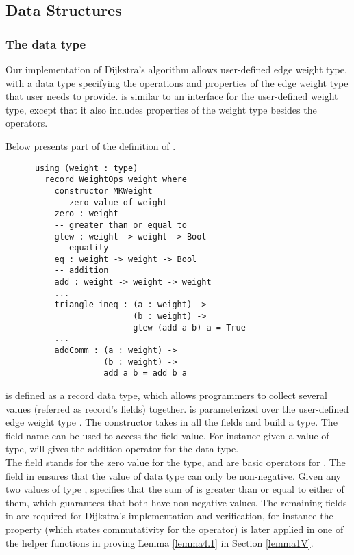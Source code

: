 \subsection{Data Structures} \label{code_structs}
\subsubsection{The  data type}
Our implementation of Dijkstra's algorithm allows user-defined edge weight type, with a  data type specifying the operations and properties of the edge weight type that user needs to provide.  is similar to an interface for the user-defined weight type, except that it also includes properties of the weight type besides the operators. 

Below presents part of the definition of . 
\begin{lstlisting}
      using (weight : type)
        record WeightOps weight where
          constructor MKWeight
          -- zero value of weight
          zero : weight
          -- greater than or equal to
          gtew : weight -> weight -> Bool
          -- equality
          eq : weight -> weight -> Bool
          -- addition
          add : weight -> weight -> weight
          ...
          triangle_ineq : (a : weight) -> 
                          (b : weight) -> 
                          gtew (add a b) a = True
          ...
          addComm : (a : weight) -> 
                    (b : weight) -> 
                    add a b = add b a
\end{lstlisting}

 is defined as a record data type, which allows programmers to collect several values (referred as record's fields) together.  is parameterized over the user-defined edge weight type . The  constructor takes in all the fields and build a  type. The field name can be used to access the field value. For instance given a value  of  type,  will gives the addition operator for the  data type. 
\\

The  field stands for the zero value for the  type, and  are basic operators for . The  field in  ensures that the value of  data type can only be non-negative. Given any two values  of type ,  specifies that the sum of  is greater than or equal to either of them, which guarantees that both  have non-negative values. The remaining fields in  are required for Dijkstra's implementation and verification, for instance the  property (which states commutativity for the  operator) is later applied in one of the helper functions in proving Lemma \ref{lemma4.1} in Section \ref{lemma1V}.
\\

